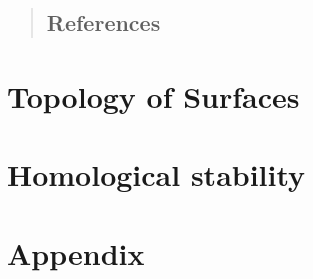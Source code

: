 

\setmainlanguage[variant=british]{english}
\newcommand{\fach}{Mapping Class Groups, Homological Stability and Madsen-Weiss-Theory}
\newcommand{\shortFach}{Madsen-Weiss-Theory}
\newcommand{\semester}{Wise 2016}
\newcommand{\homepage}{https://wwwmath.uni-muenster.de/reine/u/topos/lehre/WS2015-2016/Topologie2/}

\newcommand{\prof}{Prof.\ Dr.\ Johannes Ebert}
\publishers{}



\maketitle
\begin{abstract}

\section*{References}

\end{abstract}

\tableofcontents
\cleardoubleoddemptypage

\setcounter{page}{1}
\setcounter{footnote}{0}




\chapter{Topology of Surfaces}



\chapter{Homological stability} %
\label{cha:homological_stability}





\cleardoubleoddemptypage
{}
\setcounter{page}{1}
\cleardoubleoddemptypage
\appendix

\chapter{Appendix} %
\label{chap:appendix}

\printindex
\printbibliography
\listoffigures
\todototoc\listoftodos
